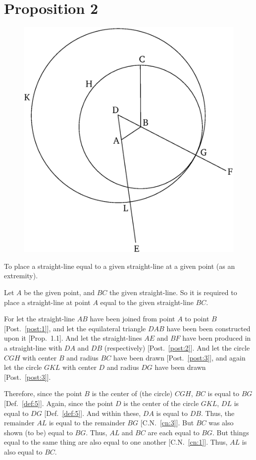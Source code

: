 \chapter*{Proposition 2}
\label{prop:2}

\begin{figure}[ht]
    \begin{center}
    \includegraphics[width=0.5\linewidth]{figures/fig02e.eps}
    \label{fig:prop_2}
    \end{center}
\end{figure}

To place a straight-line equal to a given straight-line at a given point (as an extremity).

Let $A$ be the given point, and $BC$ the given straight-line. So  it is required to
place a straight-line at point $A$ equal to the given straight-line $BC$.

For let the straight-line $AB$ have been joined from point $A$ to point $B$ [Post.~\ref{post:1}], and let the
equilateral triangle $DAB$ have been been constructed upon it [Prop.~1.1].  And let the
straight-lines $AE$ and $BF$ have been produced in a straight-line with $DA$ and $DB$  (respectively) [Post.~\ref{post:2}].
And let the circle $CGH$ with center $B$ and radius $BC$ have been drawn
[Post.~\ref{post:3}], and again let the circle $GKL$ with center $D$ and radius $DG$ have been drawn [Post.~\ref{post:3}].

Therefore, since the point $B$ is the center of (the circle) $CGH$, $BC$ is equal to 
$BG$ [Def.~\ref{def:5}]. Again, since the point $D$ is the center of the circle $GKL$, $DL$ is equal to $DG$ [Def.~\ref{def:5}]. And within these,  $DA$ is equal to $DB$. Thus, the remainder $AL$ is equal to the remainder $BG$ [C.N.~\ref{cn:3}]. But $BC$ was also shown (to be)  equal to $BG$. Thus,  $AL$
and $BC$ are each equal to $BG$. But things equal to the same thing are also equal to one another [C.N.~\ref{cn:1}]. Thus, $AL$ is also equal to $BC$.

